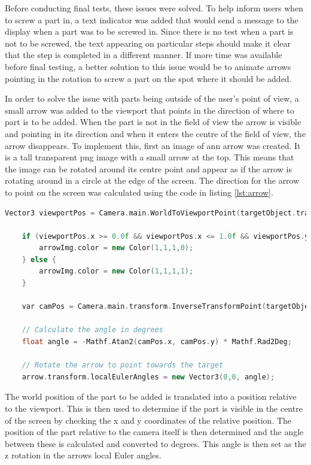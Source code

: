 \documentclass{l4proj}
\begin{document}
Before conducting final tests, these issues were solved. To help inform users when to screw a part in, a text indicator was added that would send a message to the display when a part was to be screwed in. Since there is no test when a part is not to be screwed, the text appearing on particular steps should make it clear that the step is completed in a different manner. If more time was available before final testing, a better solution to this issue would be to animate arrows pointing in the rotation to screw a part on the spot where it should be added.

In order to solve the issue with parts being outside of the user's point of view, a small arrow was added to the viewport that points in the direction of where to part is to be added. When the part is not in the field of view the arrow is visible and pointing in its direction and when it enters the centre of the field of view, the arrow disappears. To implement this, first an image of ann arrow was created. It is a tall transparent png image with a small arrow at the top. This means that the image can be rotated around its centre point and appear as if the arrow is rotating around in a circle at the edge of the screen. The direction for the arrow to point on the screen was calculated using the code in listing \ref{lst:arrow}.

\begin{lstlisting}[language=c++, caption={The code for finding the direction of the arrow and showing/hiding the arrow if it is on or off the screen.}, label=lst:arrow]
    Vector3 viewportPos = Camera.main.WorldToViewportPoint(targetObject.transform.position);
                
    if (viewportPos.x >= 0.0f && viewportPos.x <= 1.0f && viewportPos.y >= 0.0f && viewportPos.y <= 1.0f) {
        arrowImg.color = new Color(1,1,1,0);
    } else {
        arrowImg.color = new Color(1,1,1,1);
    }

    var camPos = Camera.main.transform.InverseTransformPoint(targetObject.transform.position);

    // Calculate the angle in degrees
    float angle = -Mathf.Atan2(camPos.x, camPos.y) * Mathf.Rad2Deg;

    // Rotate the arrow to point towards the target
    arrow.transform.localEulerAngles = new Vector3(0,0, angle);

\end{lstlisting}

The world position of the part to be added is translated into a position relative to the viewport. This is then used to determine if the part is visible in the centre of the screen by checking the x and y coordinates of the relative position. The position of the part relative to the camera itself is then determined and the angle between these is calculated and converted to degrees. This angle is then set as the z rotation in the arrows local Euler angles.
\end{document}
